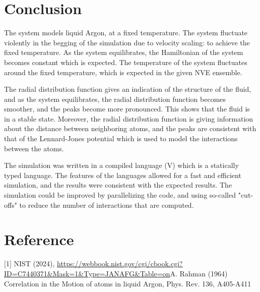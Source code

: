 \documentclass[a4paper]{article}
\newcommand{\newparagraph}{\vspace{.5cm}\noindent}
\begin{document}
\section{Conclusion}
The system models liquid Argon, at a fixed temperature. The system fluctuate violently in the begging of the simulation due to velocity scaling: to achieve the fixed temperature.
As the system equilibrates, the Hamiltonian of the system becomes constant which is expected. The temperature of the system fluctuates around the fixed temperature, which is expected in the given NVE ensemble.

\newparagraph
The radial distribution function gives an indication of the structure of the fluid, and as the system equilibrates, the radial distribution function becomes smoother, and the peaks become more pronounced. This shows that the fluid is in a stable state.
Moreover, the radial distribution function is giving information about the distance between neighboring atoms, and the peaks are consistent with that of the Lennard-Jones potential which is used to model the interactions between the atoms.

\newparagraph
The simulation was written in a compiled language (V) which is a statically typed language. The features of the languages allowed for a fast and efficient simulation, and the results were consistent with the expected results. 
The simulation could be improved by parallelizing the code, and using so-called "cut-offs" to reduce the number of interactions that are computed.


\newpage
\section{Reference}
[1] NIST (2024), \url{https://webbook.nist.gov/cgi/cbook.cgi?ID=C7440371&Mask=1&Type=JANAFG&Table=on}\newline
[2] A. Rahman (1964) Correlation in the Motion of atoms in liquid Argon, Phys. Rev. 136, A405-A411
\end{document}
